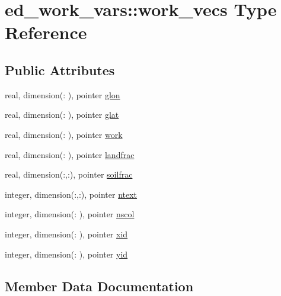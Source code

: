 \hypertarget{structed__work__vars_1_1work__vecs}{}\section{ed\+\_\+work\+\_\+vars\+:\+:work\+\_\+vecs Type Reference}
\label{structed__work__vars_1_1work__vecs}
\subsection*{Public Attributes}
\begin{DoxyCompactItemize}
\item 
real, dimension(\+: ), pointer \hyperlink{structed__work__vars_1_1work__vecs_abee061861a4c4f6dfbc1bc8ec18a463b}{glon}
\item 
real, dimension(\+: ), pointer \hyperlink{structed__work__vars_1_1work__vecs_a957e7ab559f48443828e710632887d48}{glat}
\item 
real, dimension(\+: ), pointer \hyperlink{structed__work__vars_1_1work__vecs_aa5dbf6c86b514fd72da0b0121693fcb9}{work}
\item 
real, dimension(\+: ), pointer \hyperlink{structed__work__vars_1_1work__vecs_a706bea04b2f0bd207bb88b24151b31f3}{landfrac}
\item 
real, dimension(\+:,\+:), pointer \hyperlink{structed__work__vars_1_1work__vecs_aaf7951b3fc6d10862e1a9110027766ea}{soilfrac}
\item 
integer, dimension(\+:,\+:), pointer \hyperlink{structed__work__vars_1_1work__vecs_a898272bb541b0bd262ff3efe1a0f919d}{ntext}
\item 
integer, dimension(\+: ), pointer \hyperlink{structed__work__vars_1_1work__vecs_abcd125ac3a76abc44387395c1746d25b}{nscol}
\item 
integer, dimension(\+: ), pointer \hyperlink{structed__work__vars_1_1work__vecs_afff01fc8dd99c5d3bbe9bbea9234381a}{xid}
\item 
integer, dimension(\+: ), pointer \hyperlink{structed__work__vars_1_1work__vecs_a456fdc2f1a35f3a46bab6d6affac952e}{yid}
\end{DoxyCompactItemize}


\subsection{Member Data Documentation}
